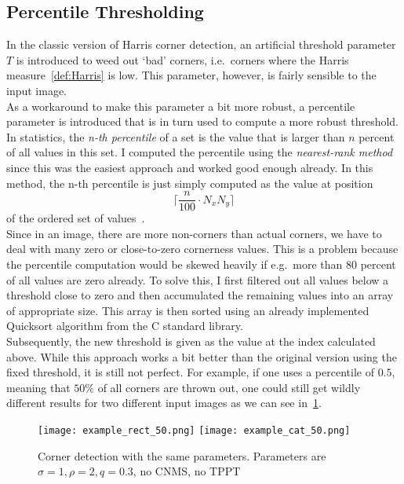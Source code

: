 \subsection{Percentile Thresholding}\label{sub:Percentile}
In the classic version of Harris corner detection, an artificial threshold parameter $T$
is introduced to weed out `bad' corners, i.e.\ corners where the \linebreak 
Harris measure~\eqref{def:Harris} is low. 
This parameter, however, is fairly sensible to the input image.\\
As a workaround to make this parameter a bit more robust, a percentile
parameter is introduced that is in turn used to compute a more robust threshold.\\
In statistics, the \textit{n-th percentile} of a set is the value that is larger than $n$ percent
of all values in this set.
I computed the percentile using the \textit{nearest-rank method} since this was the easiest
approach and worked good enough already. In this method, the n-th percentile is just simply
computed as the value at position 
\[
\lceil \frac{n}{100}\cdot N_{x}N_{y}\rceil
\] 
of the ordered set of values~\cite{percentile}.\\
Since in an image, there are more non-corners than actual corners, we have to deal with many zero
or close-to-zero cornerness values. This is a problem because the percentile computation would be skewed
heavily if e.g.\ more than 80 percent of all values are zero already. To solve this, I first filtered
out all values below a threshold close to zero and then accumulated the remaining values into an
array of appropriate size. This array is then sorted using an already implemented Quicksort
algorithm from the C standard library.\\
Subsequently, the new threshold is given as the value at
the index calculated above.
While this approach works a bit better than the original version using the fixed threshold, it is
still not perfect. For example, if one uses a percentile of $0.5$, meaning that 
$50\%$ of all corners are thrown out, one could still get wildly different results 
for two different input images as we can see in~\ref{fig:PercExample}.
\begin{figure}[h!]
    \centering
    \texttt{[image: example\_rect\_50.png]}
    \texttt{[image: example\_cat\_50.png]}
    \caption{Corner detection with the same parameters. Parameters are $\sigma=1,\rho=2,q=0.3$, no
    CNMS, no TPPT}
    \label{fig:PercExample}
\end{figure}\\
